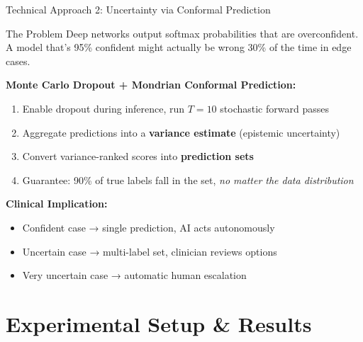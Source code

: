 \documentclass[aspectratio=169]{beamer}
\begin{document}
\begin{frame}{Technical Approach 2: Uncertainty via Conformal Prediction}
  
  \begin{block}{The Problem}
    Deep networks output softmax probabilities that are overconfident. A model that's 95\% confident might actually be wrong 30\% of the time in edge cases.
  \end{block}
  
  \vspace{0.3cm}
  
  \textbf{Monte Carlo Dropout + Mondrian Conformal Prediction:}
  
  \begin{enumerate}
    \item Enable dropout during inference, run $T=10$ stochastic forward passes
    \item Aggregate predictions into a \textbf{variance estimate} (epistemic uncertainty)
    \item Convert variance-ranked scores into \textbf{prediction sets}
    \item Guarantee: 90\% of true labels fall in the set, \emph{no matter the data distribution}
  \end{enumerate}
  
  \vspace{0.3cm}
  
  \textbf{Clinical Implication:}
  \begin{itemize}
    \item Confident case → single prediction, AI acts autonomously
    \item Uncertain case → multi-label set, clinician reviews options
    \item Very uncertain case → automatic human escalation
  \end{itemize}
  
\end{frame}

\section{Experimental Setup \& Results}
\end{document}
